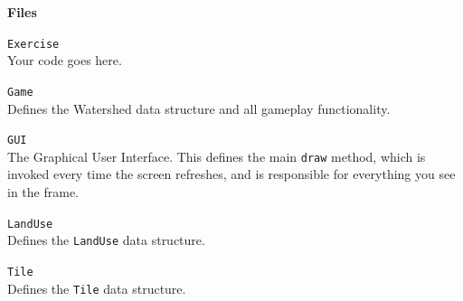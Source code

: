 \documentclass[10pt,twocolumn]{article}
\begin{document}
\medskip
\balance

\noindent\textbf{\large Files}
\begin{description}
\item{\texttt{Exercise}}\ \\[.25em]
Your code goes here.

\item{\texttt{Game}}\ \\[.25em] 
Defines the Watershed data structure and all gameplay functionality.

\item{\texttt{GUI}}\ \\[.25em] 
The Graphical User Interface. This defines the main \texttt{draw} method, which is invoked every time the screen refreshes, and is responsible for everything you see in the frame.

\item{\texttt{LandUse}}\ \\[.25em] 
Defines the \texttt{LandUse} data structure.

\item{\texttt{Tile}}\ \\[.25em] 
Defines the \texttt{Tile} data structure.

\end{description}

\medskip
\end{document}
